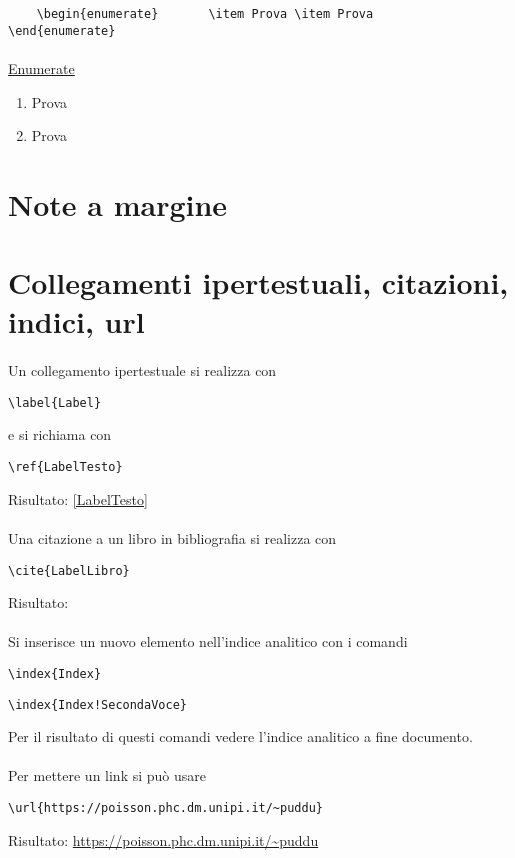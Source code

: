 \begin{verbatim}
	\begin{enumerate}		\item Prova \item Prova		\end{enumerate}
\end{verbatim}
\paragraph*{} \underline{Enumerate}
\begin{enumerate}
	\item Prova
	\item Prova
\end{enumerate}
\section{Note a margine}
	\lipsum[1]
	\lipsum[1]
	\lipsum[1]
	\lipsum[1]
\section{Collegamenti ipertestuali, citazioni, indici, url}
	\paragraph*{} Un collegamento ipertestuale si realizza con
\begin{verbatim}\label{Label}\end{verbatim}		
e si richiama con
 \begin{verbatim}\ref{LabelTesto}\end{verbatim}
 Risultato: \label{LabelTesto}\ref{LabelTesto}

\paragraph*{} Una citazione a un libro in bibliografia si realizza con
\begin{verbatim}\cite{LabelLibro}\end{verbatim}
	Risultato: \cite{Label}

\paragraph*{} Si inserisce un nuovo elemento nell'indice analitico con i comandi
\begin{verbatim}\index{Index}\end{verbatim}
\begin{verbatim}\index{Index!SecondaVoce}\end{verbatim}
Per il risultato di questi comandi vedere l'indice analitico a fine documento. 
\paragraph*{} Per mettere un link si può usare
\begin{verbatim}\url{https://poisson.phc.dm.unipi.it/~puddu}\end{verbatim}
Risultato: \url{https://poisson.phc.dm.unipi.it/~puddu}